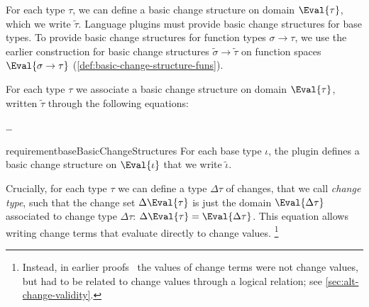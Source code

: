 For each type \ensuremath{\tau}, we can define a basic change structure on domain
\ensuremath{\Eval{\tau}}, which we write \ensuremath{\widetilde{\tau}}. Language plugins must provide basic
change structures for base types. To provide basic change structures for
function types \ensuremath{\sigma\to \tau}, we use the earlier construction for basic change
structures \ensuremath{\widetilde{\sigma}\to \widetilde{\tau}} on function spaces \ensuremath{\Eval{\sigma\to \tau}}
(\cref{def:basic-change-structure-funs}).
\begin{definition}
  \label{def:bchs-types}
  For each type \ensuremath{\tau} we associate a basic change structure on domain
  \ensuremath{\Eval{\tau}}, written \ensuremath{\widetilde{\tau}} through the following equations:
\begin{hscode}\SaveRestoreHook
{}%
%
%
\>[3]{}\widetilde{\iota}\mathrel{=}\ldots{}\<[E]%
\\
\>[3]{}\widetilde{\sigma\to \tau}\mathrel{=}\widetilde{\sigma}\to \widetilde{\tau}{}\<[E]%
\ColumnHook
\end{hscode}\resethooks
%
\end{definition}
\begin{restatable}{requirement}{baseBasicChangeStructures}
  \label{req:base-basic-change-structures}
  For each base type \ensuremath{\iota}, the plugin defines a basic change structure on
  \ensuremath{\Eval{\iota}} that we write \ensuremath{\widetilde{\iota}}.
\end{restatable}

Crucially, for each type \ensuremath{\tau} we can define a type \ensuremath{\Delta \tau} of changes, that we
call \emph{change type}, such that the change set \ensuremath{\Delta \Eval{\tau}} is just the
domain \ensuremath{\Eval{\Delta \tau}} associated to change type \ensuremath{\Delta \tau}: \ensuremath{\Delta \Eval{\tau}\mathrel{=}\Eval{\Delta \tau}}. This equation allows writing change terms that evaluate directly
to change values.%
\footnote{Instead, in earlier proofs~\citep{CaiEtAl2014ILC} the values of change
  terms were not change values, but had to be related to change values through a
  logical relation; see \cref{sec:alt-change-validity}.}


